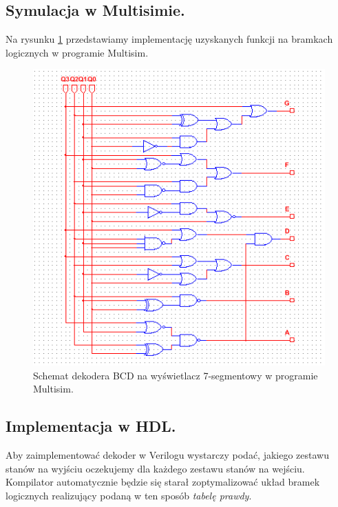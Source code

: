 \documentclass[a4paper,oneside]{report}
\newcommand{\bcdtoseg}{\texttt{bcd\textunderscore to\textunderscore 7seg}}
\begin{document}
\subsection{Symulacja w Multisimie.}
Na rysunku \ref{decoder_scheme} przedstawiamy implementację
uzyskanych funkcji na bramkach logicznych w programie Multisim.
\begin{figure}[p]
\centering
\includegraphics[width=\textwidth]{multisim/bcdto7seg.png}
\caption[Schemat dekodera BCD na wyświetlacz 7-segmentowy.]{Schemat dekodera BCD na wyświetlacz 7-segmentowy w programie Multisim.}
\label{decoder_scheme}
\end{figure}
\subsection{Implementacja w HDL.}
Aby zaimplementować dekoder w Verilogu wystarczy podać, jakiego
zestawu stanów na wyjściu oczekujemy dla każdego zestawu stanów na
wejściu. Kompilator automatycznie będzie się starał zoptymalizować
układ bramek logicznych realizujący podaną w ten sposób
\emph{tabelę prawdy}.


\end{document}
